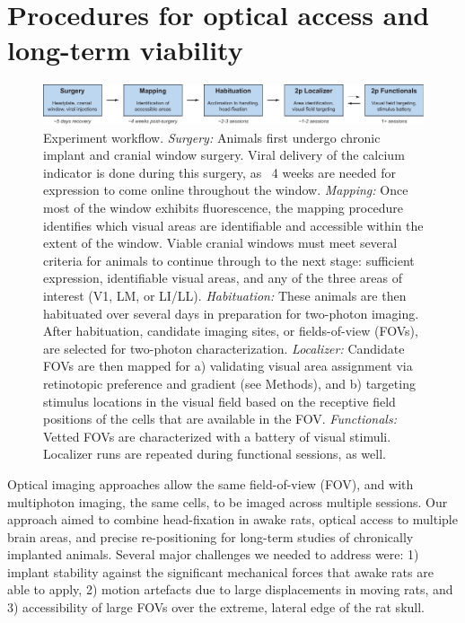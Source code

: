 \section{Procedures for optical access and long-term viability} 

\begin{figure}[t!]
    \includegraphics[width=\textwidth]{figures/chapter_2/fig_2-2_experiment_workflow/fig_2-2_experiment_workflow.pdf}
    \vspace{.1in}
    \caption[Experiment workflow]{Experiment workflow. \textit{Surgery:} Animals first undergo chronic implant and cranial window surgery. Viral delivery of the calcium indicator is done during this surgery, as ~4 weeks are needed for expression to come online throughout the window. \textit{Mapping:} Once most of the window exhibits fluorescence, the mapping procedure identifies which visual areas are identifiable and accessible within the extent of the window. Viable cranial windows must meet several criteria for animals to continue through to the next stage: sufficient expression, identifiable visual areas, and any of the three areas of interest (V1, LM, or LI/LL). \textit{Habituation:} These animals are then habituated over several days in preparation for two-photon imaging. After habituation, candidate imaging sites, or fields-of-view (FOVs), are selected for two-photon characterization. \textit{Localizer:} Candidate FOVs are then mapped for a) validating visual area assignment via retinotopic preference and gradient (see Methods), and b) targeting stimulus locations in the visual field based on the receptive field positions of the cells that are available in the FOV. \textit{Functionals:} Vetted FOVs are characterized with a battery of visual stimuli. Localizer runs are repeated during functional sessions, as well. 
    \label{fig:experiment_workflow}}
\end{figure}

Optical imaging approaches allow the same field-of-view (FOV), and with multiphoton imaging, the same cells, to be imaged across multiple sessions. Our approach aimed to combine head-fixation in awake rats, optical access to multiple brain areas, and precise re-positioning for long-term studies of chronically implanted animals. Several major challenges we needed to address were:  1) implant stability against the significant mechanical forces that awake rats are able to apply, 2) motion artefacts due to large displacements in moving rats, and 3) accessibility of large FOVs over the extreme, lateral edge of the rat skull.


